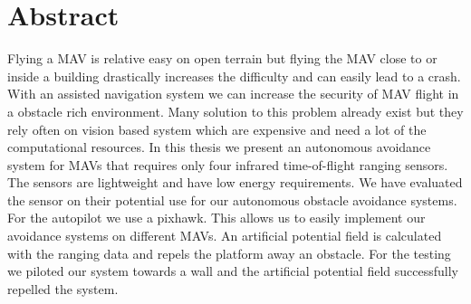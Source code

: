 \chapter*{Abstract}
Flying a MAV is relative easy on open terrain but flying the MAV close to or inside a building drastically increases the difficulty and can easily lead to a crash. With an assisted navigation system we can increase the security of MAV flight in a obstacle rich environment. Many solution to this problem already exist but they rely often on vision based system which are expensive and need a lot of the computational resources. In this thesis we present an autonomous avoidance system for MAVs that requires only four infrared time-of-flight ranging sensors. The sensors are lightweight and have low energy requirements. We have evaluated the sensor on their potential use for our autonomous obstacle avoidance systems. For the autopilot we use a pixhawk. This allows us to easily implement our avoidance systems on different MAVs. An artificial potential field is calculated with the ranging data and repels the platform away an obstacle. For the testing we piloted our system towards a wall and the artificial potential field successfully repelled the system.